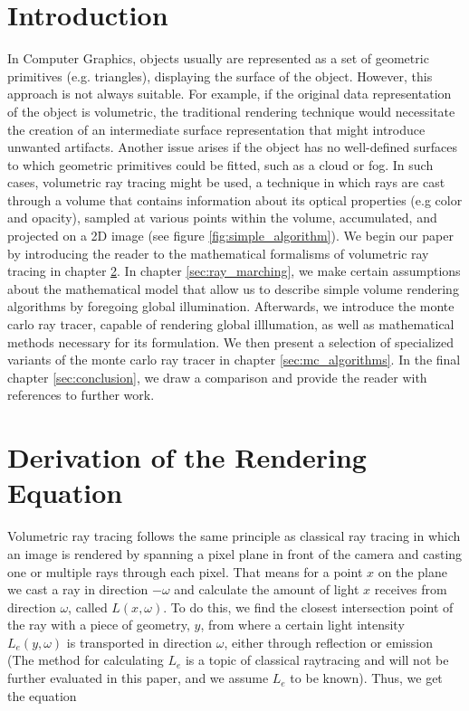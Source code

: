 \section{Introduction}
In Computer Graphics, objects usually are represented as a set of geometric primitives \cite{KOBBELT2004801} (e.g. triangles), displaying the surface of the object. However, this approach is not always suitable. For example, if the original data representation of the object is volumetric, the traditional rendering technique would necessitate the creation of an intermediate surface representation that might introduce unwanted artifacts\cite{511}. Another issue arises if the object has no well-defined surfaces to which geometric primitives could be fitted, such as a cloud or fog\cite{10.1145/964965.808594}. In such cases, volumetric ray tracing might be used, a technique in which rays are cast through a volume that contains information about its optical properties (e.g color and opacity), sampled at various points within the volume, accumulated, and projected on a 2D image (see figure \ref{fig:simple_algorithm})\cite{511}.
We begin our paper by introducing the reader to the mathematical formalisms of volumetric ray tracing in chapter \ref{sec:math}. In chapter \ref{sec:ray_marching}, we make certain assumptions about the mathematical model that allow us to describe simple volume rendering algorithms by foregoing global illumination. Afterwards, we introduce the monte carlo ray tracer, capable of rendering global illlumation, as well as mathematical methods necessary for its formulation. We then present a selection of specialized variants of the monte carlo ray tracer in chapter \ref{sec:mc_algorithms}. In the final chapter \ref{sec:conclusion}, we draw a comparison and provide the reader with references to further work. 




\section{Derivation of the Rendering Equation}
\label{sec:math}
Volumetric ray tracing follows the same principle as classical ray tracing in which an image is rendered by spanning a pixel plane in front of the camera and casting one or multiple rays through each pixel\cite{10.5555/94788}.
That means for a point ${x}$ on the plane we cast a ray in direction $-\omega$ and calculate the amount of light ${x}$ receives from direction $\omega$, called $L({x},\omega )$.
To do this, we find the closest intersection point of the ray with a piece of geometry,  ${y}$,  from where a certain light intensity $L_e({y},\omega )$ is transported in direction $\omega$, either through reflection or emission (The method for calculating $L_e$ is a topic of classical raytracing\cite{10.5555/94788} and will not be further evaluated in this paper, and we assume $L_e$ to be known).
Thus, we get the equation 


